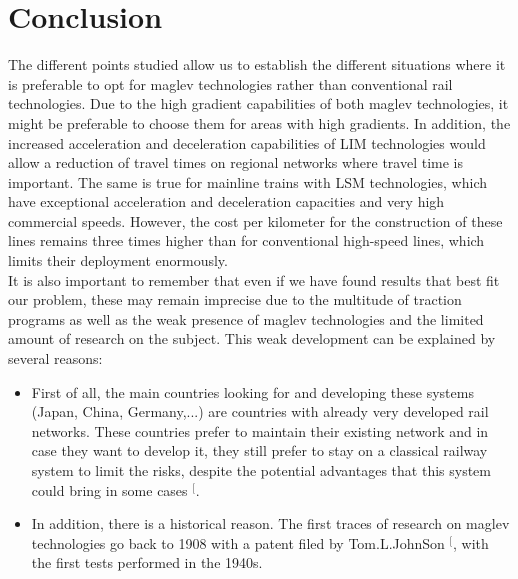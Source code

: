 \documentclass[12pt, a4paper, onecolumn]{article}
\makeatletter
\renewcommand{\tab}{\tabto{15px}}
\newcommand{\csvdel}{}
\newcommand{\bettercite}[1][,]{%
  \renewcommand{\csvdel}{\renewcommand{\csvdel}{}}%
  \csname\endcsname$^[$\checknextarg}
\newcommand{\checknextarg}{\@ifnextchar\bgroup{\gobblenext}{}}%
\newcommand{\gobblenext}[1]{\csvdel\textcolor{blue}{\textbf{\cite{#1}}}\@ifnextchar\bgroup{$^,$\gobblenext}{$^]$}}%
\makeatother
\begin{document}
\pagebreak %
\section*{Conclusion}
\tab The different points studied allow us to establish the different situations where it is preferable to opt for maglev technologies rather than conventional rail technologies.
Due to the high gradient capabilities of both maglev technologies, it might be preferable to choose them for areas with high gradients.
In addition, the increased acceleration and deceleration capabilities of LIM technologies would allow a reduction of travel times on regional networks where travel time is important.
The same is true for mainline trains with LSM technologies, which have exceptional acceleration and deceleration capacities and very high commercial speeds.
However, the cost per kilometer for the construction of these lines remains three times higher than for conventional high-speed lines, which limits their deployment enormously. \\
\linebreak
\tab It is also important to remember that even if we have found results that best fit our problem, these may remain imprecise due to the multitude of traction programs as well as the weak presence of maglev technologies and the limited amount of research on the subject.
This weak development can be explained by several reasons: \\
\begin{itemize}
  \item First of all, the main countries looking for and developing these systems (Japan, China, Germany,...) are countries with already very developed rail networks. These countries prefer to maintain their existing network and in case they want to develop it, they still prefer to stay on a classical railway system to limit the risks, despite the potential advantages that this system could bring in some cases\bettercite{maglevus}.
  \item In addition, there is a historical reason. The first traces of research on maglev technologies go back to 1908 with a patent filed by Tom.L.JohnSon\bettercite{firstpatent}, with the first tests performed in the 1940s.
\end{itemize}
\end{document}
